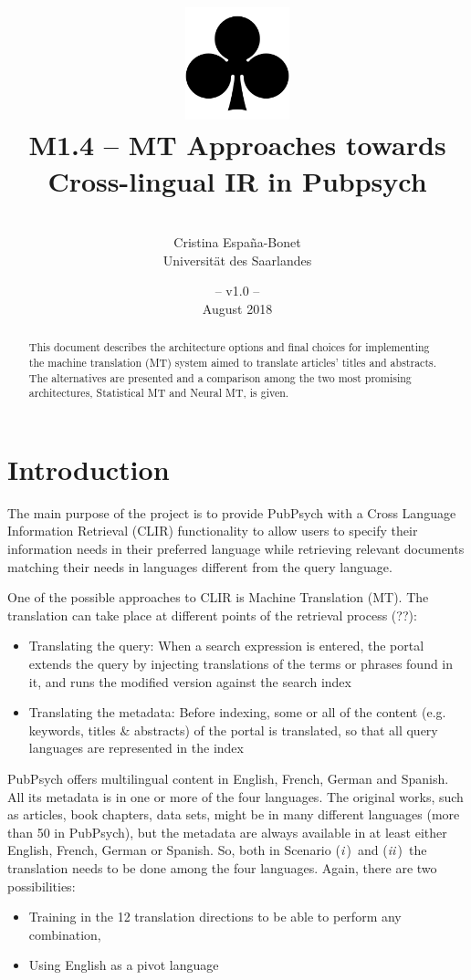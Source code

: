 \documentclass[a4paper,11pt]{article}
\title{
\includegraphics[width=3cm]{./img/200px-SuitClubs.png} \\
\Huge M1.4 -- MT Approaches towards Cross-lingual IR in Pubpsych}
\author{\vspace*{1cm}\\ \LARGE Cristina Espa\~na-Bonet \medskip \\ \Large Universit\"at des Saarlandes}
\date{\vspace*{2cm} -- v1.0 --\\August 2018}
\newcommand{\Ni}{({\em i\,})~}
\newcommand{\Nii}{({\em ii\,})~}
\begin{document}
\clearpage\maketitle
\thispagestyle{empty}\thispagestyle{empty}

\vspace*{5cm}
\begin{abstract}
This document describes the architecture options and final choices for implementing the machine translation (MT) system aimed to translate articles' titles and abstracts. The alternatives are presented and a comparison among the two most promising architectures, Statistical MT and Neural MT, is given. 
\end{abstract}

\newpage
\tableofcontents
\clearpage

\section{Introduction}
\label{s:intro}

The main purpose of the project is to provide PubPsych with a Cross Language Information Retrieval (CLIR) functionality to allow users to specify their information needs in their preferred language while retrieving relevant documents matching their needs in languages different from the query language.

One of the possible approaches to CLIR is Machine Translation (MT). The translation can take place at different points of the retrieval process (??):
\begin{itemize}
\itemsep0em 
 \item[\Ni] Translating the query: When a search expression is entered, the portal extends the query by injecting translations of the terms or phrases found in it, and runs the modified version against the search index
 \item[\Nii] Translating the metadata: Before indexing, some or all of the content (e.g. keywords, titles \& abstracts) of the portal is translated, so that all query languages are represented in the index
\end{itemize}

PubPsych offers multilingual content in English, French, German and Spanish. All its metadata is in one or more of the four languages. The original works, such as articles, book chapters, data sets, might be in many different languages (more than 50 in PubPsych), but the metadata are always available in at least either English, French, German or Spanish. So, both in Scenario \Ni and \Nii the translation needs to be done among the four languages. Again, there are two possibilities:
\begin{itemize}
\itemsep0em 
 \item[\Ni] Training in the 12 translation directions to be able to perform any combination,
 \item[\Nii] Using English as a pivot language
\end{itemize}
\end{document}
